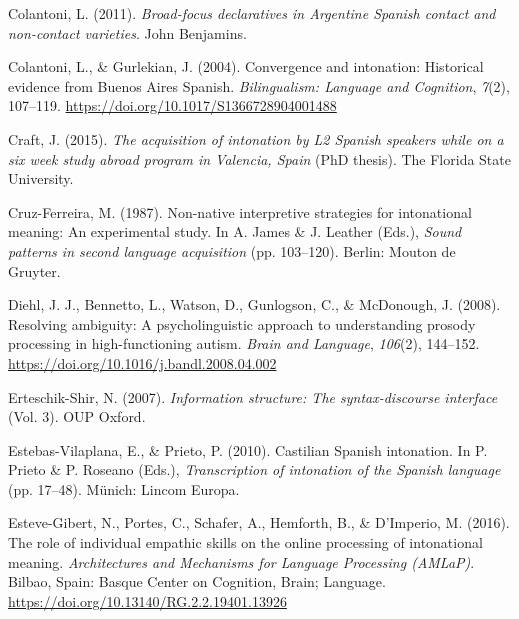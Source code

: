 \documentclass[]{article}
\newlength{\cslhangindent}
\newenvironment{CSLReferences}[2] %
 {%
  \setlength{\parindent}{0pt}
  \ifodd #1 \everypar{\setlength{\hangindent}{\cslhangindent}}\ignorespaces\fi
  \ifnum #2 > 0
  \setlength{\parskip}{#2\baselineskip}
  \fi
 }%
 {}
\begin{document}
\begin{CSLReferences}{1}{0}
\leavevmode{}%
Colantoni, L. (2011). \emph{Broad-focus declaratives in {A}rgentine {S}panish contact and non-contact varieties}. John Benjamins.

\leavevmode{}%
Colantoni, L., \& Gurlekian, J. (2004). Convergence and intonation: Historical evidence from {Buenos Aires Spanish}. \emph{Bilingualism: Language and Cognition}, \emph{7}(2), 107--119. \url{https://doi.org/10.1017/S1366728904001488}

\leavevmode{}%
Craft, J. (2015). \emph{The acquisition of intonation by {L}2 {S}panish speakers while on a six week study abroad program in {V}alencia, {S}pain} (PhD thesis). The Florida State University.

\leavevmode{}%
Cruz-Ferreira, M. (1987). Non-native interpretive strategies for intonational meaning: An experimental study. In A. James \& J. Leather (Eds.), \emph{Sound patterns in second language acquisition} (pp. 103--120). Berlin: Mouton de Gruyter.

\leavevmode{}%
Diehl, J. J., Bennetto, L., Watson, D., Gunlogson, C., \& McDonough, J. (2008). Resolving ambiguity: {A} psycholinguistic approach to understanding prosody processing in high-functioning autism. \emph{Brain and Language}, \emph{106}(2), 144--152. \url{https://doi.org/10.1016/j.bandl.2008.04.002}

\leavevmode{}%
Erteschik-Shir, N. (2007). \emph{Information structure: {T}he syntax-discourse interface} (Vol. 3). OUP Oxford.

\leavevmode{}%
Estebas-Vilaplana, E., \& Prieto, P. (2010). Castilian {S}panish intonation. In P. Prieto \& P. Roseano (Eds.), \emph{Transcription of intonation of the {S}panish language} (pp. 17--48). Münich: Lincom Europa.

\leavevmode{}%
Esteve-Gibert, N., Portes, C., Schafer, A., Hemforth, B., \& D'Imperio, M. (2016). The role of individual empathic skills on the online processing of intonational meaning. \emph{Architectures and Mechanisms for Language Processing (AMLaP)}. Bilbao, Spain: Basque Center on Cognition, Brain; Language. \url{https://doi.org/10.13140/RG.2.2.19401.13926}


\end{CSLReferences}
\end{document}
